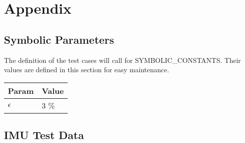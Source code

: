\documentclass[12pt, titlepage]{article}
\begin{document}

\newpage




\newpage

\section{Appendix}


\subsection{Symbolic Parameters}

The definition of the test cases will call for SYMBOLIC\_CONSTANTS. Their values are defined in this
section for easy maintenance.

\begin{table}[h]
    \centering
    \begin{tabular}{|l|l|}
    \hline
    \textbf{Param} & \textbf{Value} \\ \hline
    $\epsilon$     &      3 \%          \\ \hline
    \end{tabular}
    \end{table}





\subsection{IMU Test Data} \label{sec:imu_data}
\end{document}
